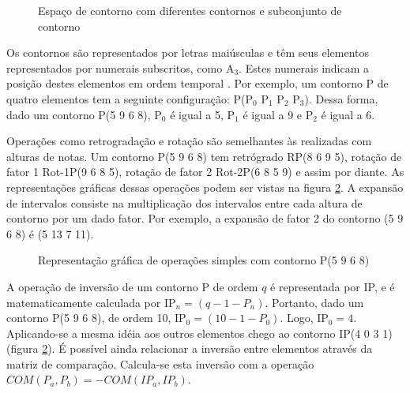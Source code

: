 \begin{figure}
  \centering

  \caption{Espaço de contorno com diferentes contornos e subconjunto
    de contorno}
  \label{fig:c-space}
\end{figure}

Os contornos são representados por letras maiúsculas e têm seus
elementos representados por numerais subscritos, como A$_3$. Estes
numerais indicam a posição destes elementos em ordem temporal
\cite{marvin.ea87:relating}. Por exemplo, um contorno P de quatro
elementos tem a seguinte configuração: P(P$_0$ P$_1$ P$_2$
P$_3$). Dessa forma, dado um contorno P(5 9 6 8), P$_0$ é igual a 5,
P$_1$ é igual a 9 e P$_2$ é igual a 6.

Operações como retrogradação e rotação são semelhantes às realizadas
com alturas de notas. Um contorno P(5 9 6 8) tem retrógrado RP(8 6 9
5), rotação de fator 1 Rot-1P(9 6 8 5), rotação de fator 2 Rot-2P(6 8
5 9) e assim por diante. As representações gráficas dessas operações
podem ser vistas na figura \ref{fig:operacoes-simples}. A expansão de
intervalos consiste na multiplicação dos intervalos entre cada altura
de contorno por um dado fator. Por exemplo, a expansão de fator 2 do
contorno (5 9 6 8) é (5 13 7 11).

\begin{figure}
  \centering
  \subfloat[Contorno P]{
    \texttt{[image: c-5968]}
    \label{fig:operacoes-p}
  }
  \subfloat[Inversão de P]{
    \texttt{[image: c-4031]}
    \label{fig:operacoes-ip}
  }
  \subfloat[Retrógrado de P]{
    \texttt{[image: c-8695]}
    \label{fig:operacoes-rp}
  }

  \subfloat[Rotação 1 de P]{
    \texttt{[image: c-9685]}
    \label{fig:operacoes-rr1}
  }
  \subfloat[Rotação 2 de P]{
    \texttt{[image: c-6859]}
    \label{fig:operacoes-rr2}
  }
  \subfloat[Rotação 3 de P]{
    \texttt{[image: c-8596]}
    \label{fig:operacoes-rr3}
  }
  \caption{Representação gráfica de operações simples com contorno P(5
  9 6 8)}
  \label{fig:operacoes-simples}
\end{figure}

A operação de inversão de um contorno P de ordem $q$ é representada
por IP, e é matematicamente calculada por IP$_n=(q-1-P_n)$. Portanto,
dado um contorno P(5 9 6 8), de ordem 10, IP$_0=(10-1-P_0)$. Logo,
IP$_0=4$. Aplicando-se a mesma idéia aos outros elementos chego ao
contorno IP(4 0 3 1) (figura \ref{fig:operacoes-simples}). É possível
ainda relacionar a inversão entre elementos através da matriz de
comparação. Calcula-se esta inversão com a operação
$COM(P_a,P_b)=-COM(IP_a,IP_b)$.

